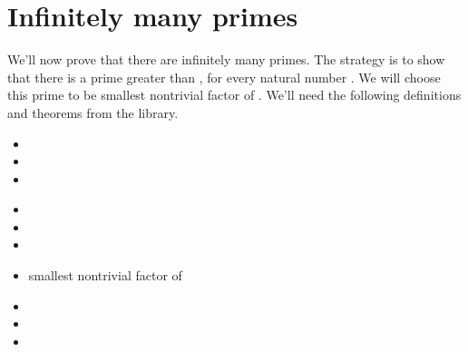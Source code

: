 \documentclass[letterpaper,10pt,english]{sphinxmanual}
\begin{document}
\section{Infinitely many primes}
\label{\detokenize{day3:id1}}
\sphinxAtStartPar
We’ll now prove that there are infinitely many primes.
The strategy is to show that there is a prime greater than , for every natural number .
We will choose this prime to be smallest non\sphinxhyphen{}trivial factor of .
We’ll need the following definitions and theorems from the library.
\begin{description}
\begin{itemize}
\item {} 
\sphinxAtStartPar
{}

\item {} 
\sphinxAtStartPar
{}

\item {} 
\sphinxAtStartPar
{}

\end{itemize}

\begin{itemize}
\item {} 
\sphinxAtStartPar
{}

\item {} 
\sphinxAtStartPar
{}

\item {} 
\sphinxAtStartPar
{}

\end{itemize}

\begin{itemize}
\item {} 
\sphinxAtStartPar
{} smallest non\sphinxhyphen{}trivial factor of 

\item {} 
\sphinxAtStartPar
{}

\item {} 
\sphinxAtStartPar
{}

\item {} 
\sphinxAtStartPar
{}

\end{itemize}

\end{description}
\end{document}

